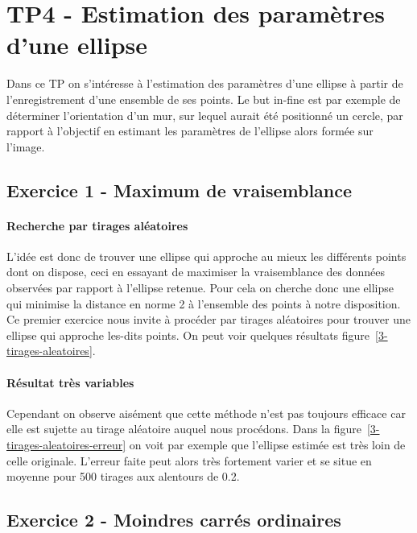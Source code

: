 \section{TP4 - Estimation des paramètres d'une ellipse}
Dans ce TP on s'intéresse à l'estimation des paramètres d'une ellipse à partir de l'enregistrement d'une ensemble de ses points. Le but in-fine est par exemple de déterminer l'orientation d'un mur, sur lequel aurait été positionné un cercle, par rapport à l'objectif en estimant les paramètres de l'ellipse alors formée sur l'image.

\subsection{Exercice 1 - Maximum de vraisemblance}
\paragraph{Recherche par tirages aléatoires}
L'idée est donc de trouver une ellipse qui approche au mieux les différents points dont on dispose, ceci en essayant de maximiser la vraisemblance des données observées par rapport à l'ellipse retenue. Pour cela on cherche donc une ellipse qui minimise la distance en norme 2 à l'ensemble des points à notre disposition. Ce premier exercice nous invite à procéder par tirages aléatoires pour trouver une ellipse qui approche les-dits points. On peut voir quelques résultats figure~\ref{3-tirages-aleatoires}.

\begin{figure}
\end{figure}

\paragraph{Résultat très variables}
Cependant on observe aisément que cette méthode n'est pas toujours efficace car elle est sujette au tirage aléatoire auquel nous procédons. Dans la figure~\ref{3-tirages-aleatoires-erreur} on voit par exemple que l'ellipse estimée est très loin de celle originale. L'erreur faite peut alors très fortement varier et se situe en moyenne pour 500 tirages aux alentours de 0.2.

\subsection{Exercice 2 - Moindres carrés ordinaires}
